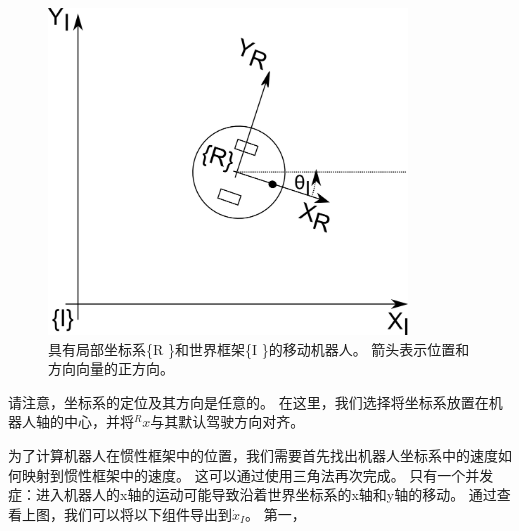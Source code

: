 \begin{figure}[htb!]
	\centering
		\includegraphics[width=0.85\textwidth]{figs/mobilerobot.png}
	\caption{具有局部坐标系\{R \}和世界框架\{I \}的移动机器人。 箭头表示位置和方向向量的正方向。}
	\label{fig:mobilerobot}
\end{figure}


请注意，坐标系的定位及其方向是任意的。 在这里，我们选择将坐标系放置在机器人轴的中心，并将$ ^ Rx $与其默认驾驶方向对齐。


为了计算机器人在惯性框架中的位置，我们需要首先找出机器人坐标系中的速度如何映射到惯性框架中的速度。 这可以通过使用三角法再次完成。 只有一个并发症：进入机器人的x轴的运动可能导致沿着世界坐标系的x轴和y轴的移动。 通过查看上图，我们可以将以下组件导出到$ \dot {x} _I $。 第一，

